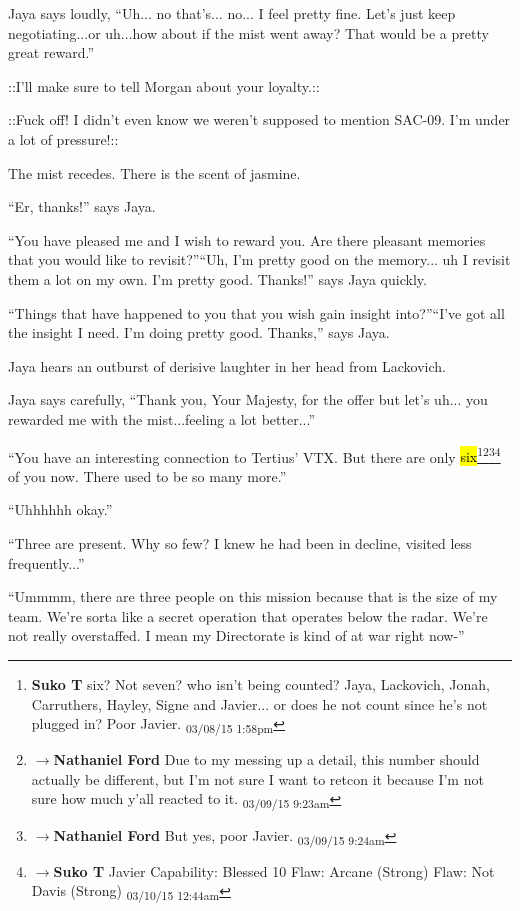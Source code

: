 Jaya says loudly, ``Uh... no that's... no... I feel pretty fine.  Let's just keep negotiating...or uh...how about if the mist went away?  That would be a pretty great reward.''

 {\color[RGB]{74,134,232}::I'll make sure to tell Morgan about your loyalty.::} 

 {\color[RGB]{255,0,0}::Fuck off!  I didn't even know we weren't supposed to mention SAC-09.  I'm under a lot of pressure!::} 

The mist recedes.  There is the scent of jasmine.

``Er, thanks!'' says Jaya.

``You have pleased me and I wish to reward you.  Are there pleasant memories that you would like to revisit?''``Uh, I'm pretty good on the memory... uh I revisit them a lot on my own.  I'm pretty good.  Thanks!'' says Jaya quickly.

``Things that have happened to you that you wish gain insight into?''``I've got all the insight I need.  I'm doing pretty good. Thanks,'' says Jaya.

Jaya hears an outburst of derisive laughter in her head from Lackovich.

Jaya says carefully, ``Thank you, Your Majesty, for the offer but let's uh... you rewarded me with the mist...feeling a lot better...''

``You have an interesting connection to Tertius' VTX.  But there are only \hl{six}\footnote{\textbf{Suko T }six?  Not seven?  who isn't being counted?  Jaya, Lackovich, Jonah, Carruthers, Hayley, Signe and Javier... or does he not count since he's not plugged in?  Poor Javier. \textsubscript{03/08/15 1:58pm}}\footnote{$\rightarrow$\textbf{Nathaniel Ford }Due to my messing up a detail, this number should actually be different, but I'm not sure I want to retcon it because I'm not sure how much y'all reacted to it. \textsubscript{03/09/15 9:23am}}\footnote{$\rightarrow$\textbf{Nathaniel Ford }But yes, poor Javier. \textsubscript{03/09/15 9:24am}}\footnote{$\rightarrow$\textbf{Suko T }Javier
Capability: Blessed 10
Flaw: Arcane (Strong)
Flaw: Not Davis (Strong) \textsubscript{03/10/15 12:44am}} of you now.  There used to be so many more.''

``Uhhhhhh okay.''

``Three are present. Why so few?  I knew he had been in decline, visited less frequently...''

``Ummmm, there are three people on this mission because that is the size of my team. We're sorta like a secret operation that operates below the radar.  We're not really overstaffed. I mean my Directorate is kind of at war right now-''

